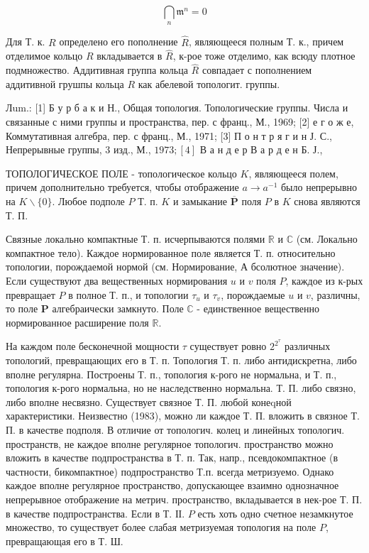 \documentclass[10pt]{article}
\begin{document}
\[

\bigcap_{n} \mathfrak{m}^{n}=0

\]



Для Т. к. $R$ определено его пополнение $\hat{R}$, являющееся полным Т. к., причем отделимое кольцо $R$ вкладывается в $\hat{R}$, к-рое тоже отделимо, как всюду плотное подмножество. Аддитивная группа кольца $\widehat{R}$ совпадает с пополнением аддитивной грушпы кольца $R$ как абелевой топологит. группы.



Лum.: [1] Б у р б а к и Н., Общая топология. Топологические группы. Числа и связанные с ними группы и пространства, пер. с франц., М., 1969; [2] е г о ж е, Коммутативная алгебра, пер. с франц., М., 1971; [3] П о н т р я г и н Ј. С., Непрерывные группы, 3 изд., М., $1973 ;[4]$ В а н д е р В а р д е н Б. Ј.,



ТОПОЛОГИЧЕСКОЕ ПОЛЕ - топологическое кольцо $K$, являющееся полем, причем дополнительно требуется, чтобы отображение $a \rightarrow a^{-1}$ было непрерывно на $K \backslash\{0\}$. Любое подполе $P$ Т. п. $K$ и замыкание $\overline{\boldsymbol{P}}$ поля $P$ в $K$ снова являются Т. П.



Связные локально компактные Т. п. исчерпываются полями $\mathbb{R}$ и $\mathbb{C}$ (см. Локально компактное тело). Каждое нормированное поле является Т. п. относительно топологии, порождаемой нормой (см. Нормирование, А бсолютное значение). Если существуют два вещественных нормирования $u$ и $v$ поля $P$, каждое из к-рых превращает $P$ в полное Т. п., и топологии $\tau_{u}$ и $\tau_{v}$, порождаемые $u$ и $v$, различны, то поле $\boldsymbol{P}$ алгебраически замкнуто. Поле $\mathbb{C}$ - единственное вещественно нормированное расширение поля $\mathbb{R}$.



На каждом поле бесконечной мощности $\tau$ существует ровно $2^{2^{\tau}}$ различных топологий, превращающих его в Т. п. Топология Т. п. либо антидискретна, либо вполне регулярна. Построены Т. п., топология к-рого не нормальна, и Т. п., топология к-рого нормальна, но не наследственно нормальна. Т. П. либо связно, либо вполне несвязно. Существует связное Т. П. любой конеqной характеристики. Неизвестно (1983), можно ли каждое Т. П. вложить в связное Т. П. в качестве подполя. В отличие от топологич. колец и линейных топологич. пространств, не каждое вполне регулярное топологич. пространство можно вложить в качестве подпространства в Т. п. Так, напр., псевдокомпактное (в частности, бикомпактное) подпространство Т.п. всегда метризуемо. Однако каждое вполне регулярное пространство, допускающее взаимно однозначное непрерывное отображение на метрич. пространство, вкладывается в нек-рое Т. П. в качестве подпространства. Если в Т. ІІ. $P$ есть хоть одно счетное незамкнутое множество, то существует более слабая метризуемая топология на поле $P$, превращающая его в Т. Ш.
\end{document}
